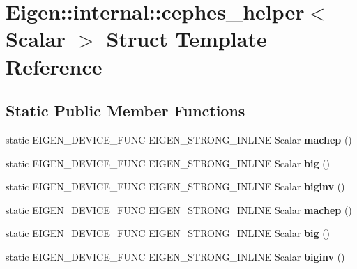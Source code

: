 \hypertarget{struct_eigen_1_1internal_1_1cephes__helper}{}\section{Eigen\+:\+:internal\+:\+:cephes\+\_\+helper$<$ Scalar $>$ Struct Template Reference}
\label{struct_eigen_1_1internal_1_1cephes__helper}
\subsection*{Static Public Member Functions}
\begin{DoxyCompactItemize}
\item 
\mbox{\label{struct_eigen_1_1internal_1_1cephes__helper_af8e5a698b386888063ff1aaf0ad58dfc}} 
static E\+I\+G\+E\+N\+\_\+\+D\+E\+V\+I\+C\+E\+\_\+\+F\+U\+NC E\+I\+G\+E\+N\+\_\+\+S\+T\+R\+O\+N\+G\+\_\+\+I\+N\+L\+I\+NE Scalar {\bfseries machep} ()
\item 
\mbox{\label{struct_eigen_1_1internal_1_1cephes__helper_a1a04b366c93aba016bd6fc12152908fe}} 
static E\+I\+G\+E\+N\+\_\+\+D\+E\+V\+I\+C\+E\+\_\+\+F\+U\+NC E\+I\+G\+E\+N\+\_\+\+S\+T\+R\+O\+N\+G\+\_\+\+I\+N\+L\+I\+NE Scalar {\bfseries big} ()
\item 
\mbox{\label{struct_eigen_1_1internal_1_1cephes__helper_aaf9d26dccde22247394ba3f629f7a50e}} 
static E\+I\+G\+E\+N\+\_\+\+D\+E\+V\+I\+C\+E\+\_\+\+F\+U\+NC E\+I\+G\+E\+N\+\_\+\+S\+T\+R\+O\+N\+G\+\_\+\+I\+N\+L\+I\+NE Scalar {\bfseries biginv} ()
\item 
\mbox{\label{struct_eigen_1_1internal_1_1cephes__helper_af8e5a698b386888063ff1aaf0ad58dfc}} 
static E\+I\+G\+E\+N\+\_\+\+D\+E\+V\+I\+C\+E\+\_\+\+F\+U\+NC E\+I\+G\+E\+N\+\_\+\+S\+T\+R\+O\+N\+G\+\_\+\+I\+N\+L\+I\+NE Scalar {\bfseries machep} ()
\item 
\mbox{\label{struct_eigen_1_1internal_1_1cephes__helper_a1a04b366c93aba016bd6fc12152908fe}} 
static E\+I\+G\+E\+N\+\_\+\+D\+E\+V\+I\+C\+E\+\_\+\+F\+U\+NC E\+I\+G\+E\+N\+\_\+\+S\+T\+R\+O\+N\+G\+\_\+\+I\+N\+L\+I\+NE Scalar {\bfseries big} ()
\item 
\mbox{\label{struct_eigen_1_1internal_1_1cephes__helper_aaf9d26dccde22247394ba3f629f7a50e}} 
static E\+I\+G\+E\+N\+\_\+\+D\+E\+V\+I\+C\+E\+\_\+\+F\+U\+NC E\+I\+G\+E\+N\+\_\+\+S\+T\+R\+O\+N\+G\+\_\+\+I\+N\+L\+I\+NE Scalar {\bfseries biginv} ()
\end{DoxyCompactItemize}


